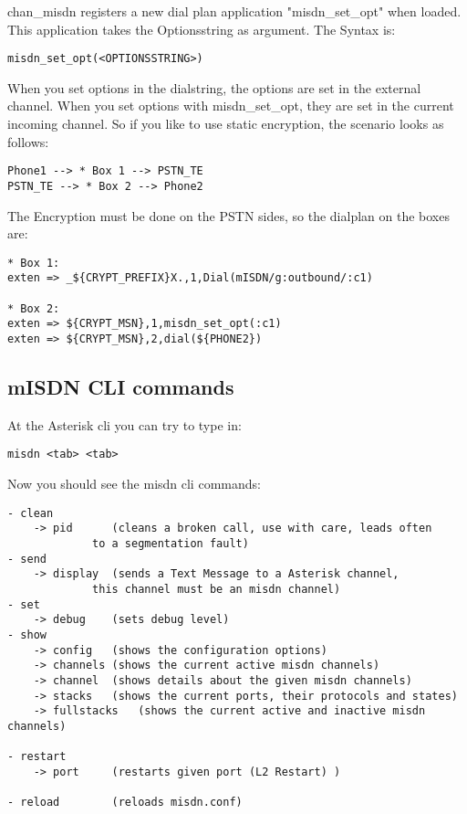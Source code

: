 chan\_misdn registers a new dial plan application "misdn\_set\_opt" when
loaded. This application takes the Optionsstring as argument. The Syntax is:

\begin{verbatim}
misdn_set_opt(<OPTIONSSTRING>)
\end{verbatim}

When you set options in the dialstring, the options are set in the external
channel. When you set options with misdn\_set\_opt, they are set in the current
incoming channel. So if you like to use static encryption, the scenario looks
as follows:

\begin{verbatim}
Phone1 --> * Box 1 --> PSTN_TE 
PSTN_TE --> * Box 2 --> Phone2
\end{verbatim}

The Encryption must be done on the PSTN sides, so the dialplan on the boxes
are:

\begin{verbatim}
* Box 1:
exten => _${CRYPT_PREFIX}X.,1,Dial(mISDN/g:outbound/:c1)

* Box 2:
exten => ${CRYPT_MSN},1,misdn_set_opt(:c1)
exten => ${CRYPT_MSN},2,dial(${PHONE2})
\end{verbatim}


\subsection{mISDN CLI commands}

At the Asterisk cli you can try to type in: 

\begin{verbatim}
misdn <tab> <tab>
\end{verbatim}

Now you should see the misdn cli commands: 

\begin{verbatim}
- clean
	-> pid 		(cleans a broken call, use with care, leads often
			 to a segmentation fault)
- send
	-> display	(sends a Text Message to a Asterisk channel, 
			 this channel must be an misdn channel)
- set
	-> debug	(sets debug level)
- show
	-> config	(shows the configuration options)
	-> channels	(shows the current active misdn channels)
	-> channel	(shows details about the given misdn channels)
	-> stacks	(shows the current ports, their protocols and states)
	-> fullstacks	(shows the current active and inactive misdn channels)

- restart 
	-> port		(restarts given port (L2 Restart) )

- reload 		(reloads misdn.conf)
\end{verbatim}

